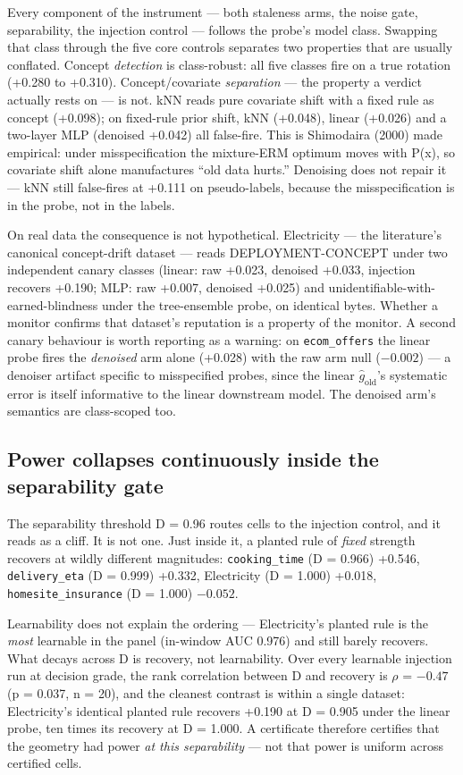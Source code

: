 \documentclass[10pt]{article} %
\begin{document}
Every component of the instrument --- both staleness arms, the noise gate, separability, the
injection control --- follows the probe's model class. Swapping that class through the five core
controls separates two properties that are usually conflated. Concept \emph{detection} is class-robust:
all five classes fire on a true rotation (+0.280 to +0.310). Concept/covariate \emph{separation} --- the
property a verdict actually rests on --- is not. kNN reads pure covariate shift with a fixed rule as
concept (+0.098); on fixed-rule prior shift, kNN (+0.048), linear (+0.026) and a two-layer MLP
(denoised +0.042) all false-fire. This is Shimodaira (2000) made empirical: under misspecification
the mixture-ERM optimum moves with P(x), so covariate shift alone manufactures ``old data hurts.''
Denoising does not repair it --- kNN still false-fires at +0.111 on pseudo-labels, because the
misspecification is in the probe, not in the labels.

On real data the consequence is not hypothetical. Electricity --- the literature's canonical
concept-drift dataset --- reads DEPLOYMENT-CONCEPT under two independent canary classes (linear:
raw +0.023, denoised +0.033, injection recovers +0.190; MLP: raw +0.007, denoised +0.025) and
unidentifiable-with-earned-blindness under the tree-ensemble probe, on identical bytes. Whether a
monitor confirms that dataset's reputation is a property of the monitor. A second canary behaviour
is worth reporting as a warning: on \texttt{ecom\_offers} the linear probe fires the \emph{denoised} arm alone
(+0.028) with the raw arm null ($-0.002$) --- a denoiser artifact specific to misspecified probes,
since the linear $\hat{g}_{\text{old}}$'s systematic error is itself informative to the linear downstream model.
The denoised arm's semantics are class-scoped too.

\subsection{Power collapses continuously inside the separability gate}\label{sec:powerrel}

The separability threshold D\* = 0.96 routes cells to the injection control, and it reads as a
cliff. It is not one. Just inside it, a planted rule of \emph{fixed} strength recovers at wildly
different magnitudes: \texttt{cooking\_time} (D = 0.966) +0.546, \texttt{delivery\_eta} (D = 0.999) +0.332,
Electricity (D = 1.000) +0.018, \texttt{homesite\_insurance} (D = 1.000) $-0.052$.

Learnability does not explain the ordering --- Electricity's planted rule is the \emph{most} learnable in
the panel (in-window AUC 0.976) and still barely recovers. What decays across D is recovery, not
learnability. Over every learnable injection run at decision grade, the rank correlation between D
and recovery is $\rho$ = $-0.47$ (p = 0.037, n = 20), and the cleanest contrast is within a single
dataset: Electricity's identical planted rule recovers +0.190 at D = 0.905 under the linear
probe, ten times its recovery at D = 1.000. A certificate therefore certifies that the geometry
had power \emph{at this separability} --- not that power is uniform across certified cells.
\end{document}
